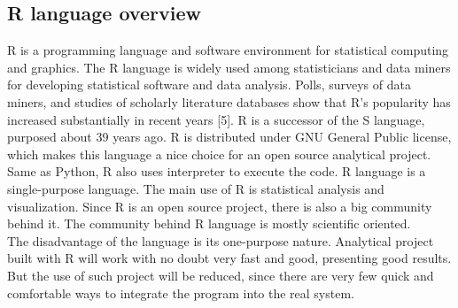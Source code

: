 \documentclass{article}
\begin{document}
\subsection{R language overview}
R is a programming language and software environment for statistical computing and graphics. The R language is widely used among statisticians and data miners for developing statistical software and data analysis. Polls, surveys of data miners, and studies of scholarly literature databases show that R's popularity has increased substantially in recent years [5]. R is a successor of the S language, purposed about 39 years ago. R is distributed under GNU General Public license, which makes this language a nice choice for an open source analytical project.\\
Same as Python, R also uses interpreter to execute the code. R language is a single-purpose language. The main use of R is statistical analysis and visualization. Since R is an open source project, there is also a big community behind it. The community behind R language is mostly scientific oriented.\\
The disadvantage of the language is its one-purpose nature. Analytical project built with R will work with no doubt very fast and good, presenting good results. But the use of such project will be reduced, since there are very few quick and comfortable ways to integrate the program into the real system.\\
\end{document}

